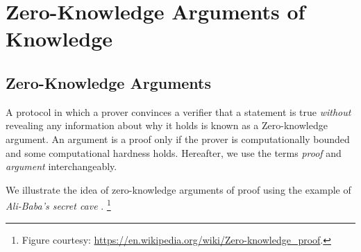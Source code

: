 \section{Zero-Knowledge Arguments of Knowledge}

\subsection{Zero-Knowledge Arguments}

A protocol in which a prover convinces a verifier that a statement
is true \textit{without} revealing any information about why it holds is known as a Zero-knowledge argument. An argument is a proof only if the prover is computationally bounded and some computational hardness holds. Hereafter, we use the terms \textit{proof} and \textit{argument} interchangeably. 

We illustrate the idea of zero-knowledge arguments of proof using the example of \textit{Ali-Baba's secret cave} \cite{jean89}. \footnote{Figure courtesy: \url{https://en.wikipedia.org/wiki/Zero-knowledge_proof}.}

